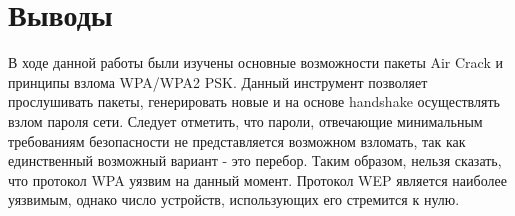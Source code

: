 \documentclass[a4paper, 14pt]{article}				%
\begin{document}
\section{Выводы}
В ходе данной работы были изучены основные возможности пакеты Air Crack и принципы взлома WPA/WPA2 PSK. Данный инструмент позволяет прослушивать пакеты, генерировать новые и на основе handshake осуществлять взлом пароля сети. Следует отметить, что пароли, отвечающие минимальным требованиям безопасности не представляется возможном взломать, так как единственный возможный вариант - это перебор. Таким образом, нельзя сказать, что протокол WPA уязвим на данный момент. Протокол WEP является наиболее уязвимым, однако число устройств, использующих его стремится к нулю.
\end{document}
